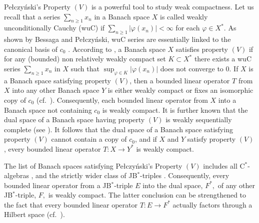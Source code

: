 \documentclass[10pt]{amsart}
\begin{document}
	
	Pe\l{}czy{\'n}ski's Property $(V)$ is a powerful tool to study weak compactness. Let us recall that a series $\displaystyle\sum_{n\geq 1} x_n$ in a Banach space $X$ is called weakly unconditionally Cauchy (wuC) if $\displaystyle \sum_{n\geq 1} |\varphi(x_n)|<\infty$ for each $\varphi \in X^*$. As shown by Bessaga and Pe\l{}czy{\'n}ski, wuC series are essentially linked to the canonical basis of $c_0$ \cite[\S VI]{DiesBook84}. According to \cite{Pelc}, a  Banach space $X$ satisfies property $(V)$ if for any (bounded) non relatively weakly compact set $K\subset X^*$ there exists a wuC series $\displaystyle\sum_{n\geq 1} x_n$ in $X$ such that $\sup_{\varphi\in K} |\varphi (x_n)|$ does
	not converge to $0$. If $X$ is a Banach space satisfying property $(V)$, then a bounded linear operator $T$ from $X$ into any other Banach space $Y$ is either weakly compact or fixes an isomorphic copy of $c_0$ (cf.\ \cite{Pelc}). Consequently, each bounded linear operator from $X$ into a Banach space not containing $c_0$ is weakly compact. It is further known that the dual space of a Banach space having property $(V)$ is weakly sequentially complete (see \cite{Pelc}). It follows that the dual space of a Banach space satisfying property $(V)$ cannot contain a copy of $c_0$, and if $X$ and $Y$ satisfy property $(V)$, every bounded linear operator $T\colon X\longrightarrow Y^*$ is weakly compact.
	
	The list of Banach spaces satisfying Pe\l{}czy{\'n}ski's Property $(V)$ includes all C$^*$-algebras \cite[Corollary 6]{Pfitzner94}, and the strictly wider class of JB$^*$-triples \cite{ChuMe97}. Consequently, every bounded linear operator from a JB$^*$-triple $E$ into the dual space, $F^*,$ of any other JB$^*$-triple, $F,$ is weakly compact. The latter conclusion can be strengthened to the fact that every bounded linear operator $T\colon E\longrightarrow F^*$ actually factors through a Hilbert space (cf.\ \cite[Lemma 5]{ChuIoLou}).
	
\end{document}
